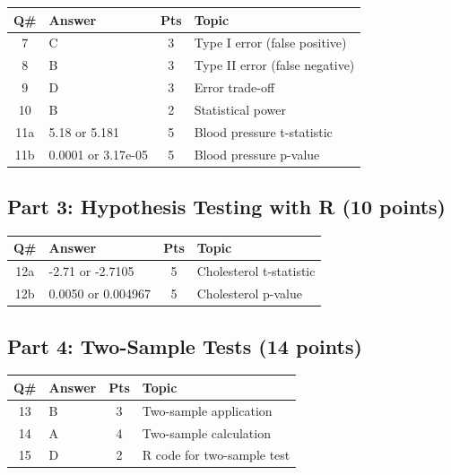 \documentclass[11pt]{article}
\begin{document}
\begin{table}[h]
\begin{tabular}{clcp{8cm}}
\toprule
\textbf{Q\#} & \textbf{Answer} & \textbf{Pts} & \textbf{Topic} \\
\midrule
7 & \textcolor{correctgreen}{C} & 3 & Type I error (false positive) \\
8 & \textcolor{correctgreen}{B} & 3 & Type II error (false negative) \\
9 & \textcolor{correctgreen}{D} & 3 & Error trade-off \\
10 & \textcolor{correctgreen}{B} & 2 & Statistical power \\
11a & \textcolor{correctgreen}{5.18 or 5.181} & 5 & Blood pressure t-statistic \\
11b & \textcolor{correctgreen}{0.0001 or 3.17e-05} & 5 & Blood pressure p-value \\
\bottomrule
\end{tabular}
\end{table}

\subsection*{Part 3: Hypothesis Testing with R (10 points)}

\begin{table}[h]
\begin{tabular}{clcp{8cm}}
\toprule
\textbf{Q\#} & \textbf{Answer} & \textbf{Pts} & \textbf{Topic} \\
\midrule
12a & \textcolor{correctgreen}{-2.71 or -2.7105} & 5 & Cholesterol t-statistic \\
12b & \textcolor{correctgreen}{0.0050 or 0.004967} & 5 & Cholesterol p-value \\
\bottomrule
\end{tabular}
\end{table}

\subsection*{Part 4: Two-Sample Tests (14 points)}

\begin{table}[h]
\begin{tabular}{clcp{8cm}}
\toprule
\textbf{Q\#} & \textbf{Answer} & \textbf{Pts} & \textbf{Topic} \\
\midrule
13 & \textcolor{correctgreen}{B} & 3 & Two-sample application \\
14 & \textcolor{correctgreen}{A} & 4 & Two-sample calculation \\
15 & \textcolor{correctgreen}{D} & 2 & R code for two-sample test \\
\bottomrule
\end{tabular}
\end{table}
\end{document}
